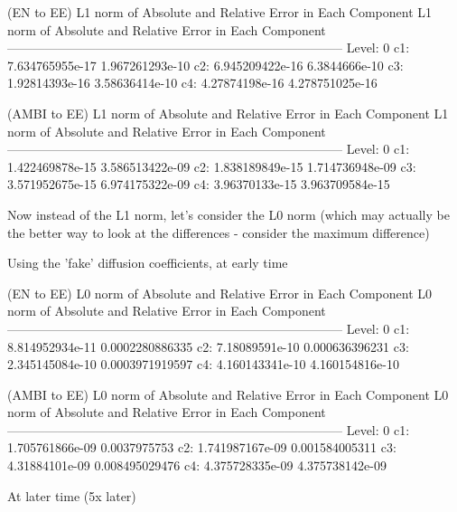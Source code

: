 \documentclass[final]{siamltex}
\begin{document}
(EN to EE) L1 norm of Absolute and Relative Error in Each Component
L1 norm of Absolute and Relative Error in Each Component
--------------------------------------------------------------------------------
Level:  0
                                c1:      7.634765955e-17     1.967261293e-10
                                c2:      6.945209422e-16       6.3844666e-10
                                c3:       1.92814393e-16      3.58636414e-10
                                c4:       4.27874198e-16     4.278751025e-16

(AMBI to EE) L1 norm of Absolute and Relative Error in Each Component
L1 norm of Absolute and Relative Error in Each Component
--------------------------------------------------------------------------------
Level:  0
                                c1:      1.422469878e-15     3.586513422e-09
                                c2:      1.838189849e-15     1.714736948e-09
                                c3:      3.571952675e-15     6.974175322e-09
                                c4:       3.96370133e-15     3.963709584e-15


Now instead of the L1 norm, let's consider the L0 norm (which may actually be
the better way to look at the differences - consider the maximum difference)

Using the 'fake' diffusion coefficients, at early time

(EN to EE) L0 norm of Absolute and Relative Error in Each Component
L0 norm of Absolute and Relative Error in Each Component
--------------------------------------------------------------------------------
Level:  0
                                c1:      8.814952934e-11     0.0002280886335
                                c2:       7.18089591e-10      0.000636396231
                                c3:      2.345145084e-10     0.0003971919597
                                c4:      4.160143341e-10     4.160154816e-10


(AMBI to EE) L0 norm of Absolute and Relative Error in Each Component
L0 norm of Absolute and Relative Error in Each Component
--------------------------------------------------------------------------------
Level:  0
                                c1:      1.705761866e-09        0.0037975753
                                c2:      1.741987167e-09      0.001584005311
                                c3:       4.31884101e-09      0.008495029476
                                c4:      4.375728335e-09     4.375738142e-09


At later time (5x later)
\end{document}
